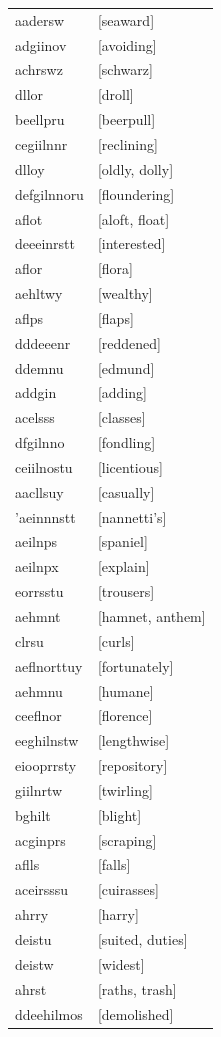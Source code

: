 \documentclass{article}
\begin{document}
\begin{tabular}{ll}
aadersw & [seaward] \\
adgiinov & [avoiding] \\
achrswz & [schwarz] \\
dllor & [droll] \\
beellpru & [beerpull] \\
cegiilnnr & [reclining] \\
dlloy & [oldly, dolly] \\
defgilnnoru & [floundering] \\
aflot & [aloft, float] \\
deeeinrstt & [interested] \\
aflor & [flora] \\
aehltwy & [wealthy] \\
aflps & [flaps] \\
dddeeenr & [reddened] \\
ddemnu & [edmund] \\
addgin & [adding] \\
acelsss & [classes] \\
dfgilnno & [fondling] \\
ceiilnostu & [licentious] \\
aacllsuy & [casually] \\
'aeinnnstt & [nannetti's] \\
aeilnps & [spaniel] \\
aeilnpx & [explain] \\
eorrsstu & [trousers] \\
aehmnt & [hamnet, anthem] \\
clrsu & [curls] \\
aeflnorttuy & [fortunately] \\
aehmnu & [humane] \\
ceeflnor & [florence] \\
eeghilnstw & [lengthwise] \\
eiooprrsty & [repository] \\
giilnrtw & [twirling] \\
bghilt & [blight] \\
acginprs & [scraping] \\
aflls & [falls] \\
aceirsssu & [cuirasses] \\
ahrry & [harry] \\
deistu & [suited, duties] \\
deistw & [widest] \\
ahrst & [raths, trash] \\
ddeehilmos & [demolished] \\

\end{tabular}
\end{document}
